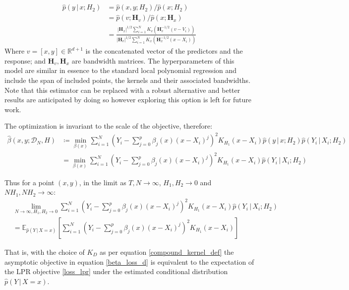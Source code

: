 \documentclass[preprint,1p,times]{elsarticle}
\begin{document}
\begin{align}
\hat{p}(y \, | \, x; H_2) &= \hat{p} (x, y ; H_2) / \hat{p} (x; H_2) \\
&= \hat{p} (v ; \mathbf{H}_v) / \hat{p} (x; \mathbf{H}_x) \\
&= \frac{|\mathbf{H}_x|^{1/2} \sum_{i=1}^N K_v \left( \mathbf{H}_v^{-1/2} (v - V_i) \right)} {|\mathbf{H}_v|^{1/2} \sum_{i=1}^N K_x \left( \mathbf{H}_x^{-1/2} (x - X_i) \right)}
\label{conditional_prob_est}
\end{align}
Where $v=[x,y] \in \mathbb{R}^{d+1}$ is the concatenated vector of the predictors and the response; and $\mathbf{H}_v, \mathbf{H}_x$ are bandwidth matrices. The hyperparameters of this model are similar in essence to the standard local polynomial regression and include the span of included points, the kernels and their associated bandwidths. Note that this estimator can be replaced with a robust alternative and better results are anticipated by doing so however exploring this option is left for future work. \newline  

The optimization is invariant to the scale of the objective, therefore:
\begin{align}
\hat{\beta}(x,y ; \mathcal{D}_N , H) & \coloneqq \min_{\beta(x)} \sum_{i=1}^N \left(  Y_i - \sum_{j=0}^p \beta_j (x) (x - X_i)^j \right)^2 K_{H_1} (x - X_i) \hat{p}(y \, | \, x ; H_2) \hat{p}(Y_i \, | \, X_i; H_2) \\
&= \min_{\beta(x)} \sum_{i=1}^N \left(  Y_i - \sum_{j=0}^p \beta_j (x) (x - X_i)^j \right)^2 K_{H_1} (x - X_i) \hat{p}(Y_i \, | \, X_i; H_2)
\end{align}

Thus for a point $(x,y)$, in the limit as $T, N \rightarrow \infty$, $H_1, H_2 \rightarrow 0$ and $NH_1, NH_2 \rightarrow \infty$:
\begin{align}
& \lim_{N \rightarrow \infty, H_1, H_2 \rightarrow 0}  \sum_{i=1}^N \left(  Y_i - \sum_{j=0}^p \beta_j (x) (x - X_i)^j \right)^2 K_{H_1} (x - X_i) \hat{p}(Y_i \, | \, X_i; H_2) \\
& = \mathbb{E}_{\hat{p} (Y \, | \, X=x)} \left[  \sum_{i=1}^N \left(  Y_i - \sum_{j=0}^p \beta_j (x) (x - X_i)^j \right)^2 K_{H_1} (x - X_i) \right]
\end{align}

That is, with the choice of $K_D$ as per equation \eqref{compound_kernel_def} the asymptotic objective in equation \eqref{beta_loss_d} is equivalent to the expectation of the LPR objective \eqref{loss_lpr} under the estimated conditional distribution $\hat{p} (Y \, | \, X=x)$.
\end{document}
